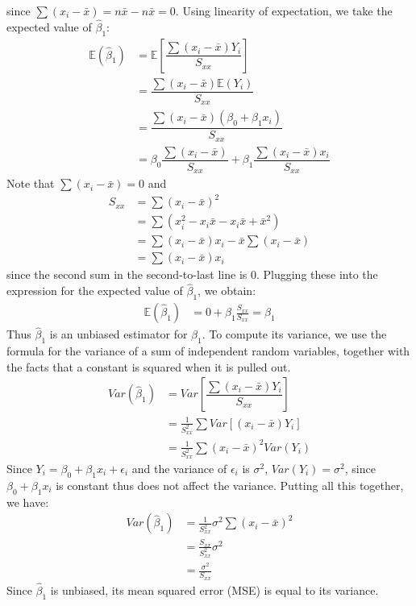 \documentclass[12pt]{article}
\theoremstyle{definition}
\theoremstyle{remark}
\def\E{{\mathbb E}}
\begin{document}
since $\sum (x_i - \bar{x}) = n \bar{x} - n \bar{x} = 0$. Using linearity of expectation, we take the expected value of $\hat{\beta}_1$:
\begin{align*}
\E( \hat{\beta}_1 ) &= \E\left[ \dfrac{ \sum (x_i - \bar{x})Y_i }{S_{xx}} \right] \\
&= \dfrac{ \sum (x_i - \bar{x}) \E(Y_i) }{S_{xx}} \\
&= \dfrac{ \sum (x_i - \bar{x})(\beta_0 + \beta_1 x_i)}{S_{xx}} \\
&= \beta_0 \dfrac{ \sum (x_i - \bar{x})}{S_{xx}} + \beta_1 \dfrac{ \sum (x_i - \bar{x})x_i}{S_{xx}} 
\end{align*}
Note that $\sum (x_i - \bar{x}) = 0$ and 
\begin{align*}
S_{xx} &= \sum (x_i - \bar{x})^2 \\
&= \sum (x_i^2 - x_i \bar{x} - x_i \bar{x} + \bar{x}^2 ) \\
&= \sum (x_i - \bar{x})x_i - \bar{x} \sum (x_i - \bar{x}) \\
&= \sum (x_i - \bar{x})x_i 
\end{align*}
since the second sum in the second-to-last line is 0. Plugging these into the expression for the expected value of $\hat{\beta}_1$, we obtain:
\begin{align*}
\E( \hat{\beta}_1 ) &= 0 + \beta_1 \frac{ S_{xx} }{ S_{xx} } = \beta_1
\end{align*}
Thus $\hat{\beta}_1$ is an unbiased estimator for $\beta_1$. To compute its variance, we use the formula for the variance of a sum of independent random variables, together with the facts that a constant is squared when it is pulled out.
\begin{align*}
Var( \hat{\beta}_1 ) &= Var \left[ \dfrac{ \sum (x_i - \bar{x})Y_i }{S_{xx}} \right] \\
&= \frac{1}{S_{xx}^2} \sum Var \left[ (x_i - \bar{x})Y_i \right] \\
&= \frac{1}{S_{xx}^2} \sum (x_i - \bar{x})^2 Var(Y_i) 
\end{align*}
Since $Y_i = \beta_0 + \beta_1 x_i + \epsilon_i$ and the variance of $\epsilon_i$ is $\sigma^2$, $Var(Y_i) = \sigma^2$, since $\beta_0 + \beta_1 x_i$ is constant thus does not affect the variance. Putting all this together, we have:
\begin{align*}
Var( \hat{\beta}_1 ) &= \frac{1}{S_{xx}^2} \sigma^2 \sum (x_i - \bar{x})^2 \\
&= \frac{ S_{xx} }{ S_{xx}^2 } \sigma^2 \\
&= \frac{ \sigma^2 }{S_{xx}}
\end{align*}
Since $\hat{\beta}_1$ is unbiased, its mean squared error (MSE) is equal to its variance.\\
\end{document}
